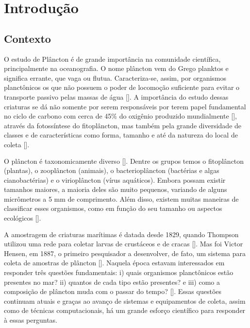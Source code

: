 \chapter{Introdução}
\label{cap:introducao}


\section{Contexto}
\label{sec:intro_contexto}



O estudo de Plâncton é de grande importância na comunidade científica, principalmente na oceanografia. O nome plâncton vem do Grego planktos e significa errante, que vaga ou flutua. Caracteriza-se, assim, por organismos planctônicos os que não possuem o poder de locomoção suficiente para evitar o transporte passivo pelas massas de água [\cite{calazans2011organismos}].  A importância do estudo dessas criaturas se dá não somente por serem responsáveis por terem papel fundamental no ciclo de carbono com cerca de 45\% do oxigênio produzido mundialmente [\cite{brierleyplankton}],  através da fotossíntese do fitoplâncton, mas também pela grande diversidade de classes e de características como forma, tamanho e até da natureza do local de coleta [\cite{calazans2011organismos}]. 

O plâncton é taxonomicamente diverso [\cite{brierleyplankton}]. Dentre os grupos temos o fitoplâncton (plantas), o zooplâncton (animais), o bacterioplâncton (bactérias e algas cianobactérias) e o virioplâncton (vírus aquáticos). Embora possam existir tamanhos maiores, a maioria deles são muito pequenos, variando de alguns micrômetros a 5 mm de comprimento. Além disso, existem muitas maneiras de classificar esses organismos, como em função do seu tamanho ou aspectos ecológicos [\cite{calazans2011organismos}].


A amostragem de criaturas marítimas é datada desde 1829, quando Thompson utilizou uma rede para coletar larvas de crustáceos e de cracas [\cite{brierleyplankton}]. Mas foi Victor Hensen, em 1887, o primeiro pesquisador a desenvolver, de fato, um sistema para coleta de amostras de plâncton [\cite{benfield2007rapid, wiebe2003hensen, allen1919contribution}]. Naquela época estavam interessados em responder três questões fundamentais: i) quais organismos planctônicos estão presentes no mar? ii) quantos de cada tipo estão presentes? e iii) como a composição de plâncton muda com o passar do tempo?  [\cite{benfield2007rapid}]. Essas questões continuam atuais e graças ao avanço de sistemas e equipamentos de coleta, assim como de técnicas computacionais, há um grande esforço científico para responder à essas perguntas.


